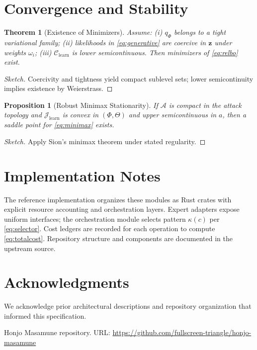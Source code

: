 \documentclass[12pt,a4paper]{article}
\newtheorem{theorem}{Theorem}
\newtheorem{proposition}{Proposition}
\begin{document}
\section{Convergence and Stability}
\begin{theorem}[Existence of Minimizers]
Assume: (i) $q_{\Phi}$ belongs to a tight variational family; (ii) likelihoods in \eqref{eq:generative} are coercive in $\mathbf{z}$ under weights $\omega_i$; (iii) $\mathcal{C}_{\text{learn}}$ is lower semicontinuous. Then minimizers of \eqref{eq:relbo} exist.
\end{theorem}
\begin{proof}[Sketch]
Coercivity and tightness yield compact sublevel sets; lower semicontinuity implies existence by Weierstrass.
\end{proof}

\begin{proposition}[Robust Minimax Stationarity]
If $\mathcal{A}$ is compact in the attack topology and $\mathcal{J}_{\text{learn}}$ is convex in $(\Phi,\Theta)$ and upper semicontinuous in $a$, then a saddle point for \eqref{eq:minimax} exists.
\end{proposition}
\begin{proof}[Sketch]
Apply Sion's minimax theorem under stated regularity.
\end{proof}

\section{Implementation Notes}
The reference implementation organizes these modules as Rust crates with explicit resource accounting and orchestration layers. Expert adapters expose uniform interfaces; the orchestration module selects pattern $\kappa(c)$ per \eqref{eq:selector}. Cost ledgers are recorded for each operation to compute \eqref{eq:totalcost}. Repository structure and components are documented in the upstream source.

\section*{Acknowledgments}
We acknowledge prior architectural descriptions and repository organization that informed this specification.

\begin{thebibliography}{9}
Honjo Masamune repository. URL: \url{https://github.com/fullscreen-triangle/honjo-masamune}
\end{thebibliography}
\end{document}
